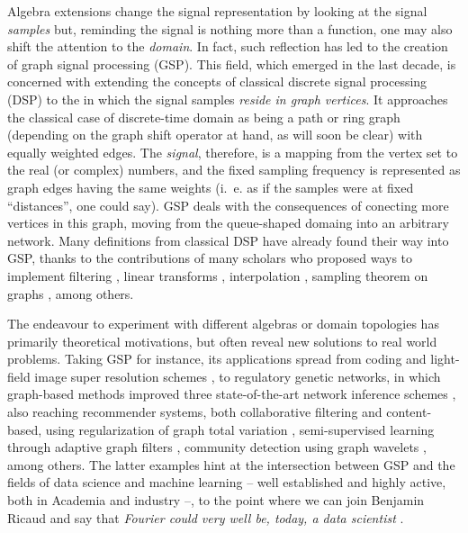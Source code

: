 Algebra extensions change the signal representation by looking at the signal \textit{samples} but, reminding the signal is nothing more than a function, one may also shift the attention to the \textit{domain}. In fact, such reflection has led to the creation of graph signal processing (GSP). This field, which emerged in the last decade, is concerned with extending the concepts of classical discrete signal processing (DSP) to the in which the signal samples \textit{reside in graph vertices}. It approaches the classical case of discrete-time domain as being a path or ring graph (depending on the graph shift operator at hand, as will soon be clear) with equally weighted edges. The \textit{signal}, therefore, is a mapping from the vertex set to the real (or complex) numbers, and the fixed sampling frequency is represented as graph edges having the same weights (i.~e. as if the samples were at fixed ``distances'', one could say). GSP deals with the consequences of conecting more vertices in this graph, moving from the queue-shaped domaing into an arbitrary network. Many definitions from classical DSP have already found their way into GSP, thanks to the contributions of many scholars who proposed ways to implement filtering \cite{sandryhaila2013filters}, linear transforms \cite{sandryhaila2013gft,sardellitti2017graph}, interpolation \cite{segarra2015interpolation}, sampling theorem on graphs \cite{wang2015generalized,chen2016signal,tsitsvero2016signals}, among others.

The endeavour to experiment with different algebras or domain topologies has primarily theoretical motivations, but often reveal new solutions to real world problems. Taking GSP for instance, its applications spread from coding \cite{su2017graph} and light-field image super resolution schemes \cite{rossi2017graph}, to regulatory genetic networks, in which graph-based methods improved three state-of-the-art network inference schemes \cite{pirayre2015brane,pirayre2017brane}, also reaching recommender systems, both collaborative filtering and content-based, using regularization of graph total variation \cite{benzi2016song}, semi-supervised learning through adaptive graph filters \cite{chen2014semi}, community detection using graph wavelets \cite{tremblay2014graph}, among others. The latter examples hint at the intersection between GSP and the fields of data science and machine learning -- well established and highly active, both in Academia and industry --, to the point where we can join Benjamin Ricaud and say that \emph{Fourier could very well be, today, a data scientist} \cite{ricaud2019fourier}.

